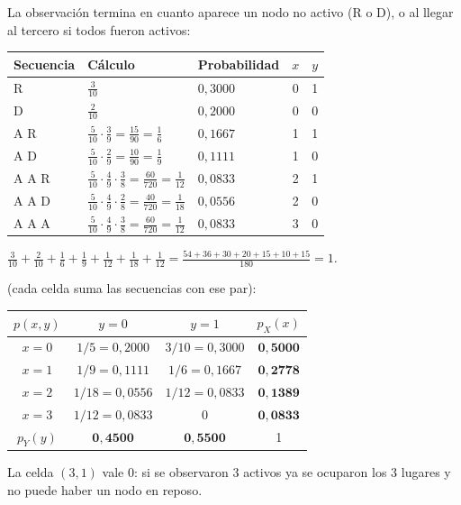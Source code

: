  La observación termina en cuanto aparece un nodo no activo (R o D), o al llegar al tercero si todos fueron activos:
\begin{center}
\renewcommand{\arraystretch}{1.25}
\begin{tabular}{@{}lllcc@{}}
\toprule
Secuencia & Cálculo & Probabilidad & $x$ & $y$\\\midrule
R & $\frac{3}{10}$ & $0{,}3000$ & 0 & 1\\
D & $\frac{2}{10}$ & $0{,}2000$ & 0 & 0\\
A R & $\frac{5}{10}\cdot\frac{3}{9}=\frac{15}{90}=\frac16$ & $0{,}1667$ & 1 & 1\\
A D & $\frac{5}{10}\cdot\frac{2}{9}=\frac{10}{90}=\frac19$ & $0{,}1111$ & 1 & 0\\
A A R & $\frac{5}{10}\cdot\frac{4}{9}\cdot\frac{3}{8}=\frac{60}{720}=\frac1{12}$ & $0{,}0833$ & 2 & 1\\
A A D & $\frac{5}{10}\cdot\frac{4}{9}\cdot\frac{2}{8}=\frac{40}{720}=\frac1{18}$ & $0{,}0556$ & 2 & 0\\
A A A & $\frac{5}{10}\cdot\frac{4}{9}\cdot\frac{3}{8}=\frac{60}{720}=\frac1{12}$ & $0{,}0833$ & 3 & 0\\\bottomrule
\end{tabular}
\end{center}
 $\frac3{10}+\frac2{10}+\frac16+\frac19+\frac1{12}+\frac1{18}+\frac1{12}=\frac{54+36+30+20+15+10+15}{180}=1$. \checkmark

 (cada celda suma las secuencias con ese par):
\begin{center}
\renewcommand{\arraystretch}{1.3}
\begin{tabular}{@{}c|cc|c@{}}
\toprule
$p(x,y)$ & $y=0$ & $y=1$ & $p_X(x)$\\\midrule
$x=0$ & $1/5=0{,}2000$ & $3/10=0{,}3000$ & $\mathbf{0{,}5000}$\\
$x=1$ & $1/9=0{,}1111$ & $1/6=0{,}1667$ & $\mathbf{0{,}2778}$\\
$x=2$ & $1/18=0{,}0556$ & $1/12=0{,}0833$ & $\mathbf{0{,}1389}$\\
$x=3$ & $1/12=0{,}0833$ & $0$ & $\mathbf{0{,}0833}$\\\midrule
$p_Y(y)$ & $\mathbf{0{,}4500}$ & $\mathbf{0{,}5500}$ & 1\\\bottomrule
\end{tabular}
\end{center}
La celda $(3,1)$ vale 0: si se observaron 3 activos ya se ocuparon los 3 lugares y no puede haber un nodo en reposo.

